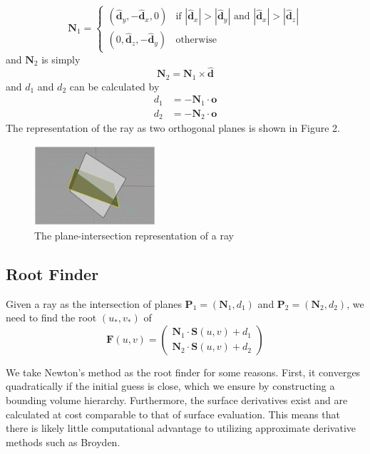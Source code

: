 \documentclass[acmtog]{acmart}
\begin{document}
\[
    \mathbf{N}_1=\begin{cases}
        (\hat{\mathbf{d}}_y,-\hat{\mathbf{d}}_x,0)&\text{if }|\hat{\mathbf{d}}_x|>|\hat{\mathbf{d}}_y|\text{ and }|\hat{\mathbf{d}}_x|>|\hat{\mathbf{d}}_z|\\
        (0,\hat{\mathbf{d}}_z,-\hat{\mathbf{d}}_y)&\text{otherwise}
    \end{cases}
\]
and $\mathbf{N}_2$ is simply
\[
    \mathbf{N}_2=\mathbf{N}_1\times\hat{\mathbf{d}}
\]
and $d_1$ and $d_2$ can be calculated by
\[
    \begin{split}
        d_1&=-\mathbf{N}_1\cdot\mathbf{o}\\
        d_2&=-\mathbf{N}_2\cdot\mathbf{o}
    \end{split}
\]
The representation of the ray as two orthogonal planes is shown in Figure 2.
\begin{figure}[htbp]
    \centering
    \includegraphics[width=0.4\textwidth]{ray.png}
    \caption{The plane-intersection representation of a ray}
\end{figure}
\subsection{Root Finder}
\hspace*{8pt}
Given a ray as the intersection of planes $\mathbf{P}_1=(\mathbf{N}_1,d_1)$ and $\mathbf{P}_2=(\mathbf{N}_2,d_2)$, we need to find the root $(u_*,v_*)$ of
\[
    \mathbf{F}(u,v)=\begin{pmatrix}
        \mathbf{N}_1\cdot\mathbf{S}(u,v)+d_1\\
        \mathbf{N}_2\cdot\mathbf{S}(u,v)+d_2
    \end{pmatrix}
\]

We take Newton's method as the root finder for some reasons. First, it converges quadratically if the initial guess is close, which we ensure by constructing a bounding volume hierarchy. Furthermore, the surface derivatives exist and are calculated at cost comparable to that of surface evaluation. This means that there is likely little computational advantage to utilizing approximate derivative methods such as Broyden.
\end{document}
